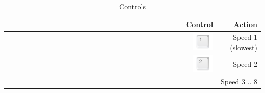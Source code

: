 \documentclass[11pt,a4paper]{report}
\begin{document}
\begin{table}[htbp]
  \centering
  \caption{Controls}
    \def\buttonsize{0.1}
    \begin{tabular}{rr}
    \toprule
          Control & Action \\
    \toprule
          \includegraphics[width=\buttonsize\textwidth]{Button1} & Speed 1 (slowest)\\
    \midrule
          \includegraphics[width=\buttonsize\textwidth]{Button2} & Speed 2 \\
    \midrule
          & Speed 3 .. 8  \\

\end{tabular}
\end{table}
\end{document}

